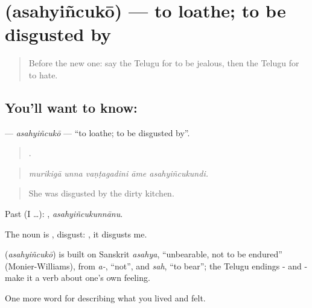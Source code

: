 \section[\texorpdfstring{\te{అసహ్యించుకో} (asahyiñcukō)}{అసహ్యించుకో (asahyiñcukō)}]{ (asahyiñcukō) — to loathe; to be disgusted by}

\label{lesson:TE-C499-asahyincuko}



\begin{quote}
Before the new one: say the Telugu for to be jealous, then the Telugu for to hate.
\end{quote}

\subsection*{You'll want to know: }
\textbf{} — \emph{asahyiñcukō} — \textquotedblleft{}to loathe; to be disgusted by\textquotedblright{}.

\begin{quote}
    .
\end{quote}

\begin{quote}
\emph{murikigā unna vaṇṭagadini āme asahyiñcukundi.}
\end{quote}

\begin{quote}
She was disgusted by the dirty kitchen.
\end{quote}

Past (I …): , \emph{asahyiñcukunnānu}.

The noun is , disgust:   , it disgusts me.

\begin{cousinweb}
\textbf{} (\emph{asahyiñcukō}) is built on Sanskrit \emph{asahya}, \textquotedblleft{}unbearable, not to be endured\textquotedblright{} (Monier-Williams), from \emph{a-}, \textquotedblleft{}not\textquotedblright{}, and \emph{sah}, \textquotedblleft{}to bear\textquotedblright{}; the Telugu endings - and - make it a verb about one's own feeling.
\end{cousinweb}

\begin{grammarlens}[title={What you've built}]
One more word for describing what you lived and felt.
\end{grammarlens}

